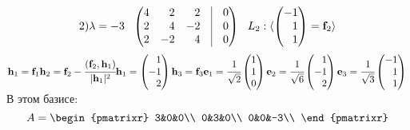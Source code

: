 $$
2) \lambda=-3 \:\:\: 
\begin{pmatrix*}[r]
 4 & 2 & 2 & \vrule & 0\\
 2 & 4 & -2 & \vrule & 0\\
 2 & -2 & 4 & \vrule & 0\\
\end{pmatrix*}
\:\:\:  
L_2:
 \langle \left(
\begin{matrix*}[r]
-1\\ 1\\ 1\\ 
\end{matrix*}
\right)=\textbf{f}_2 \rangle
$$
$
\textbf{h}_1=\textbf{f}_1\\
\textbf{h}_2=\textbf{f}_2 - \cfrac{(\textbf{f}_2,\textbf{h}_1)}{|\textbf{h}_1|^2} \textbf{h}_1=\left(
\begin{matrix*}[r]
1\\ -1\\ 2\\ 
\end{matrix*}
\right)
\textbf{h}_3=\textbf{f}_3\\
\textbf{e}_1 =\cfrac{1}{\sqrt{2}}
\begin{pmatrix*}[r]
1\\ 1\\ 0\\ 
\end{pmatrix*}
\textbf{e}_2 =\cfrac{1}{\sqrt{6}}
\begin{pmatrix*}[r]
1\\ -1\\ 2\\  
\end{pmatrix*}
\textbf{e}_3 =\cfrac{1}{\sqrt{3}}
\begin{pmatrix*}[r]
-1\\ 1\\ 1\\  
\end{pmatrix*}
 \\
$
В этом базисе:
$$
A = \begin{pmatrixr}
3&0&0\\
0&3&0\\
0&0&-3\\
\end{pmatrixr}
$$